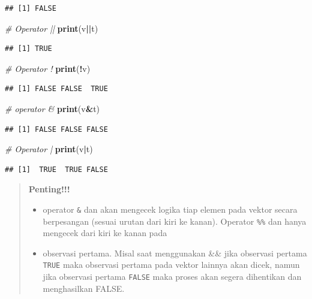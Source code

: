 \documentclass[]{book}
\newenvironment{Shaded}{\begin{snugshade}}{\end{snugshade}}
\newcommand{\CommentTok}[1]{\textcolor[rgb]{0.56,0.35,0.01}{\textit{#1}}}
\newcommand{\KeywordTok}[1]{\textcolor[rgb]{0.13,0.29,0.53}{\textbf{#1}}}
\newcommand{\NormalTok}[1]{#1}
\newcommand{\OperatorTok}[1]{\textcolor[rgb]{0.81,0.36,0.00}{\textbf{#1}}}
\providecommand{\tightlist}{%
  \setlength{\itemsep}{0pt}\setlength{\parskip}{0pt}}
\theoremstyle{definition}
\theoremstyle{definition}
\theoremstyle{definition}
\theoremstyle{remark}
\begin{document}
\begin{verbatim}
## [1] FALSE
\end{verbatim}

\begin{Shaded}
\begin{Highlighting}[]
\CommentTok{# Operator ||}
\KeywordTok{print}\NormalTok{(v}\OperatorTok{||}\NormalTok{t)}
\end{Highlighting}
\end{Shaded}

\begin{verbatim}
## [1] TRUE
\end{verbatim}

\begin{Shaded}
\begin{Highlighting}[]
\CommentTok{# Operator !}
\KeywordTok{print}\NormalTok{(}\OperatorTok{!}\NormalTok{v)}
\end{Highlighting}
\end{Shaded}

\begin{verbatim}
## [1] FALSE FALSE  TRUE
\end{verbatim}

\begin{Shaded}
\begin{Highlighting}[]
\CommentTok{# operator &}
\KeywordTok{print}\NormalTok{(v}\OperatorTok{&}\NormalTok{t)}
\end{Highlighting}
\end{Shaded}

\begin{verbatim}
## [1] FALSE FALSE FALSE
\end{verbatim}

\begin{Shaded}
\begin{Highlighting}[]
\CommentTok{# Operator |}
\KeywordTok{print}\NormalTok{(v}\OperatorTok{|}\NormalTok{t)}
\end{Highlighting}
\end{Shaded}

\begin{verbatim}
## [1]  TRUE  TRUE FALSE
\end{verbatim}

\begin{quote}
\textbf{Penting!!!}

\begin{itemize}
\tightlist
\item
  operator \texttt{\&} dan \texttt{\textbar{}} akan mengecek logika tiap elemen pada vektor secara berpesangan (sesuai urutan dari kiri ke kanan).
  Operator \texttt{\%\%} dan \texttt{\textbar{}\textbar{}} hanya mengecek dari kiri ke kanan pada
\item
  observasi pertama. Misal saat menggunakan \&\& jika observasi pertama \texttt{TRUE} maka observasi pertama pada vektor lainnya akan dicek, namun jika observasi pertama \texttt{FALSE} maka proses akan segera dihentikan dan menghasilkan FALSE.
\end{itemize}
\end{quote}
\end{document}
